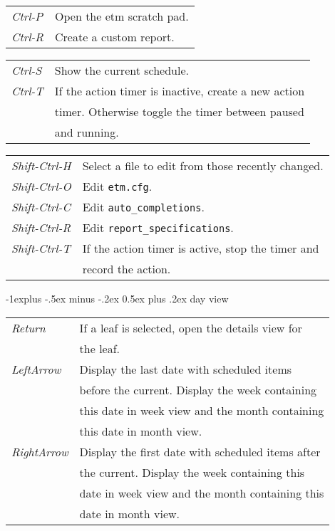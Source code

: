 \documentclass[9pt,landscape]{article}
\makeatletter
\renewcommand{\subsection}{\@startsection{subsection}{2}{0mm}%
                                {-1explus -.5ex minus -.2ex}%
                                {0.5ex plus .2ex}%
                                {\normalfont\normalsize\bfseries}}
\makeatother
\begin{document}
\begin{multicols}{3}
\begin{tabular}{@{}ll@{}}
\emph{Ctrl-P}        & Open the etm scratch pad. \\
\emph{Ctrl-R}        & Create a custom report. \\
\end{tabular}
\begin{tabular}{@{}ll@{}}
\emph{Ctrl-S}        & Show the current schedule. \\
\emph{Ctrl-T}        & If the action timer is inactive, create a new action \\
                        & timer. Otherwise toggle the timer between paused \\
                        & and running. \\
\end{tabular}
\begin{tabular}{@{}ll@{}}
\emph{Shift-Ctrl-H}  & Select a file to edit from those recently changed. \\
\emph{Shift-Ctrl-O}  & Edit \verb'etm.cfg'. \\
\emph{Shift-Ctrl-C}  & Edit \verb'auto_completions'. \\
\emph{Shift-Ctrl-R}  & Edit \verb'report_specifications'. \\
\emph{Shift-Ctrl-T}  & If the action timer is active, stop the timer and \\
                        & record the action. \\
\end{tabular}

\subsection{day view}

\begin{tabular}{@{}ll@{}}
\emph{Return}     & If a leaf is selected, open the details view for \\
                  & the leaf. \\
\emph{LeftArrow}  & Display the last date with scheduled items \\
                  & before the current. Display the week containing \\
                  & this date in week view and the month containing \\
                  & this date in month view. \\
\emph{RightArrow} & Display the first date with scheduled items after \\
                  & the current. Display the week containing this \\
                  & date in week view and the month containing this \\
                  & date in month view. \\
\end{tabular}



\end{multicols}
\end{document}
